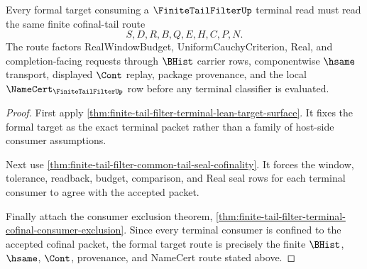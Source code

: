\begin{theorem}
\label{thm:finite-tail-filter-formal-target-consumer-route}
Every formal target consuming a $\FiniteTailFilterUp$ terminal read must read the same finite cofinal-tail route
$$
S,D,R,B,Q,E,H,C,P,N.
$$
The route factors RealWindowBudget, UniformCauchyCriterion, Real, and completion-facing requests through $\BHist$ carrier rows, componentwise $\hsame$ transport, displayed $\Cont$ replay, package provenance, and the local $\NameCert_{\FiniteTailFilterUp}$ row before any terminal classifier is evaluated.
\end{theorem}
\begin{proof}
First apply \autoref{thm:finite-tail-filter-terminal-lean-target-surface}. It fixes the formal target as the exact terminal packet rather than a family of host-side consumer assumptions.

Next use \autoref{thm:finite-tail-filter-common-tail-seal-cofinality}. It forces the window, tolerance, readback, budget, comparison, and Real seal rows for each terminal consumer to agree with the accepted packet.

Finally attach the consumer exclusion theorem, \autoref{thm:finite-tail-filter-terminal-cofinal-consumer-exclusion}. Since every terminal consumer is confined to the accepted cofinal packet, the formal target route is precisely the finite $\BHist$, $\hsame$, $\Cont$, provenance, and NameCert route stated above.
\end{proof}

